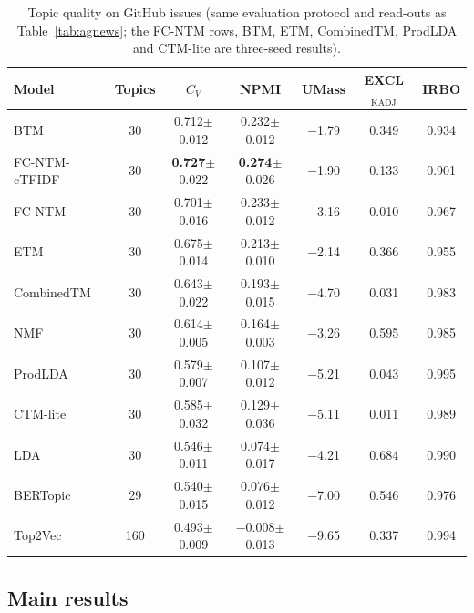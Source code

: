 \documentclass[11pt]{article}
\newcommand{\fcntm}{FC-NTM}
\begin{document}
\begin{table}[t]
\centering
\caption{Topic quality on GitHub issues (same evaluation protocol and read-outs as Table~\ref{tab:agnews}; the FC-NTM rows, BTM, ETM, CombinedTM, ProdLDA and CTM-lite are three-seed results).}
\label{tab:github}
\small
\begin{tabular}{lcccccc}
\toprule
Model & Topics & $C_V$ & NPMI & UMass & EXCL$_{\mathrm{KADJ}}$ & IRBO \\
\midrule
BTM & 30 & 0.712$\pm$0.012 & 0.232$\pm$0.012 & $-$1.79 & 0.349 & 0.934 \\
\fcntm{}-cTFIDF & 30 & \textbf{0.727}$\pm$0.022 & \textbf{0.274}$\pm$0.026 & $-$1.90 & 0.133 & 0.901 \\
\fcntm{} & 30 & 0.701$\pm$0.016 & 0.233$\pm$0.012 & $-$3.16 & 0.010 & 0.967 \\
ETM & 30 & 0.675$\pm$0.014 & 0.213$\pm$0.010 & $-$2.14 & 0.366 & 0.955 \\
CombinedTM & 30 & 0.643$\pm$0.022 & 0.193$\pm$0.015 & $-$4.70 & 0.031 & 0.983 \\
NMF & 30 & 0.614$\pm$0.005 & 0.164$\pm$0.003 & $-$3.26 & 0.595 & 0.985 \\
ProdLDA & 30 & 0.579$\pm$0.007 & 0.107$\pm$0.012 & $-$5.21 & 0.043 & 0.995 \\
CTM-lite & 30 & 0.585$\pm$0.032 & 0.129$\pm$0.036 & $-$5.11 & 0.011 & 0.989 \\
LDA & 30 & 0.546$\pm$0.011 & 0.074$\pm$0.017 & $-$4.21 & 0.684 & 0.990 \\
BERTopic & 29 & 0.540$\pm$0.015 & 0.076$\pm$0.012 & $-$7.00 & 0.546 & 0.976 \\
Top2Vec & 160 & 0.493$\pm$0.009 & $-$0.008$\pm$0.013 & $-$9.65 & 0.337 & 0.994 \\
\bottomrule
\end{tabular}
\end{table}

\subsection{Main results}
\end{document}
